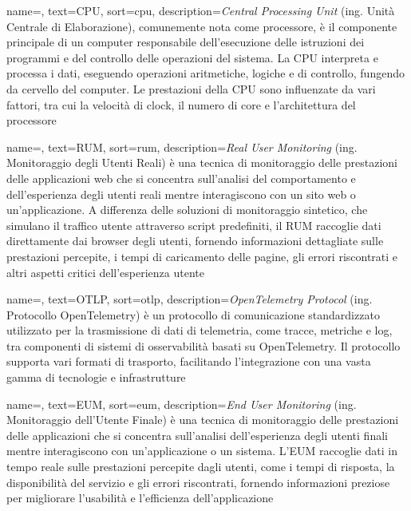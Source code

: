  {
    name=,
    text=CPU,
    sort=cpu,
    description={\emph{Central Processing Unit} (ing. Unità Centrale di Elaborazione), comunemente nota come processore, è il componente principale di un computer responsabile dell'esecuzione delle istruzioni dei programmi e del controllo delle operazioni del sistema. La CPU interpreta e processa i dati, eseguendo operazioni aritmetiche, logiche e di controllo, fungendo da cervello del computer. Le prestazioni della CPU sono influenzate da vari fattori, tra cui la velocità di clock, il numero di core e l'architettura del processore}
}

 {
    name=,
    text=RUM,
    sort=rum,
    description={\emph{Real User Monitoring} (ing. Monitoraggio degli Utenti Reali) è una tecnica di monitoraggio delle prestazioni delle applicazioni web che si concentra sull'analisi del comportamento e dell'esperienza degli utenti reali mentre interagiscono con un sito web o un'applicazione. A differenza delle soluzioni di monitoraggio sintetico, che simulano il traffico utente attraverso script predefiniti, il RUM raccoglie dati direttamente dai browser degli utenti, fornendo informazioni dettagliate sulle prestazioni percepite, i tempi di caricamento delle pagine, gli errori riscontrati e altri aspetti critici dell'esperienza utente}
}

 {
    name=,
    text=OTLP,
    sort=otlp,
    description={\emph{OpenTelemetry Protocol} (ing. Protocollo OpenTelemetry) è un protocollo di comunicazione standardizzato utilizzato per la trasmissione di dati di telemetria, come tracce, metriche e log, tra componenti di sistemi di osservabilità basati su OpenTelemetry. Il protocollo supporta vari formati di trasporto, facilitando l'integrazione con una vasta gamma di tecnologie e infrastrutture}
}

 {
    name=,
    text=EUM,
    sort=eum,
    description={\emph{End User Monitoring} (ing. Monitoraggio dell'Utente Finale) è una tecnica di monitoraggio delle prestazioni delle applicazioni che si concentra sull'analisi dell'esperienza degli utenti finali mentre interagiscono con un'applicazione o un sistema. L'EUM raccoglie dati in tempo reale sulle prestazioni percepite dagli utenti, come i tempi di risposta, la disponibilità del servizio e gli errori riscontrati, fornendo informazioni preziose per migliorare l'usabilità e l'efficienza dell'applicazione}
}

